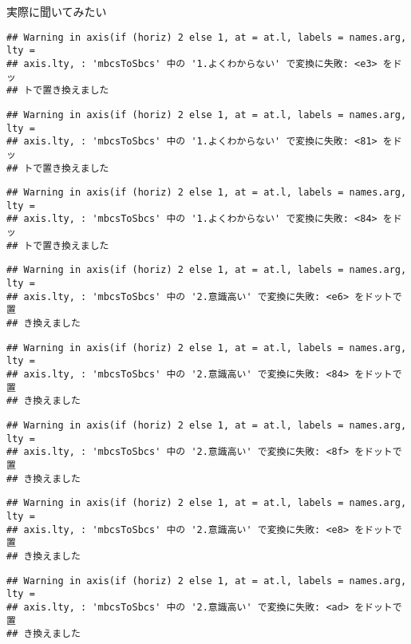 \documentclass[ignorenonframetext,]{beamer}
\begin{document}
\begin{frame}[fragile]{実際に聞いてみたい}
\begin{verbatim}
## Warning in axis(if (horiz) 2 else 1, at = at.l, labels = names.arg, lty =
## axis.lty, : 'mbcsToSbcs' 中の '1.よくわからない' で変換に失敗: <e3> をドッ
## トで置き換えました
\end{verbatim}

\begin{verbatim}
## Warning in axis(if (horiz) 2 else 1, at = at.l, labels = names.arg, lty =
## axis.lty, : 'mbcsToSbcs' 中の '1.よくわからない' で変換に失敗: <81> をドッ
## トで置き換えました
\end{verbatim}

\begin{verbatim}
## Warning in axis(if (horiz) 2 else 1, at = at.l, labels = names.arg, lty =
## axis.lty, : 'mbcsToSbcs' 中の '1.よくわからない' で変換に失敗: <84> をドッ
## トで置き換えました
\end{verbatim}

\begin{verbatim}
## Warning in axis(if (horiz) 2 else 1, at = at.l, labels = names.arg, lty =
## axis.lty, : 'mbcsToSbcs' 中の '2.意識高い' で変換に失敗: <e6> をドットで置
## き換えました
\end{verbatim}

\begin{verbatim}
## Warning in axis(if (horiz) 2 else 1, at = at.l, labels = names.arg, lty =
## axis.lty, : 'mbcsToSbcs' 中の '2.意識高い' で変換に失敗: <84> をドットで置
## き換えました
\end{verbatim}

\begin{verbatim}
## Warning in axis(if (horiz) 2 else 1, at = at.l, labels = names.arg, lty =
## axis.lty, : 'mbcsToSbcs' 中の '2.意識高い' で変換に失敗: <8f> をドットで置
## き換えました
\end{verbatim}

\begin{verbatim}
## Warning in axis(if (horiz) 2 else 1, at = at.l, labels = names.arg, lty =
## axis.lty, : 'mbcsToSbcs' 中の '2.意識高い' で変換に失敗: <e8> をドットで置
## き換えました
\end{verbatim}

\begin{verbatim}
## Warning in axis(if (horiz) 2 else 1, at = at.l, labels = names.arg, lty =
## axis.lty, : 'mbcsToSbcs' 中の '2.意識高い' で変換に失敗: <ad> をドットで置
## き換えました
\end{verbatim}


\end{frame}
\end{document}
